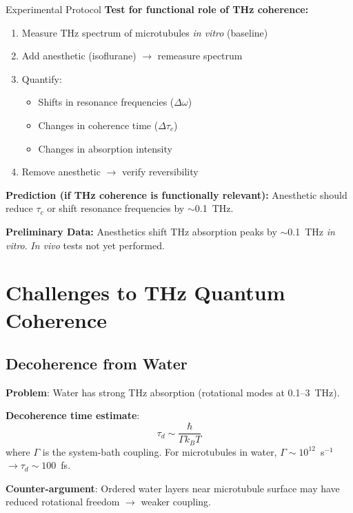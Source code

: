 \begin{calloutbox}{Experimental Protocol}
\textbf{Test for functional role of THz coherence:}

\begin{enumerate}
\item Measure THz spectrum of microtubules \textit{in vitro} (baseline)
\item Add anesthetic (isoflurane) $\rightarrow$ remeasure spectrum
\item Quantify:
  \begin{itemize}
  \item Shifts in resonance frequencies ($\Delta\omega$)
  \item Changes in coherence time ($\Delta\tau_c$)
  \item Changes in absorption intensity
  \end{itemize}
\item Remove anesthetic $\rightarrow$ verify reversibility
\end{enumerate}

\textbf{Prediction (if THz coherence is functionally relevant):} Anesthetic should reduce $\tau_c$ or shift resonance frequencies by $\sim$0.1~THz.

\textbf{Preliminary Data:} Anesthetics shift THz absorption peaks by $\sim$0.1~THz \textit{in vitro}. \textit{In vivo} tests not yet performed.
\end{calloutbox}

\section{Challenges to THz Quantum Coherence}\label{challenges-to-thz-quantum-coherence}

\subsection{Decoherence from Water}\label{decoherence-from-water}

\textbf{Problem}: Water has strong THz absorption (rotational modes at 0.1--3~THz).

\textbf{Decoherence time estimate}:
\begin{equation}
\label{eq:decoherence-time}
\tau_d \sim \frac{\hbar}{\Gamma k_B T}
\end{equation}
where $\Gamma$ is the system-bath coupling. For microtubules in water, $\Gamma \sim 10^{12}$~s$^{-1}$ $\rightarrow \tau_d \sim 100$~fs.

\textbf{Counter-argument}: Ordered water layers near microtubule surface may have reduced rotational freedom $\rightarrow$ weaker coupling.

